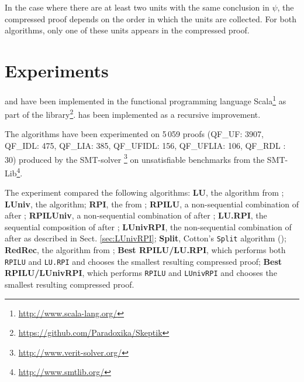 \documentclass{easychair}
\begin{document}
In the case where there are at least two units with the same conclusion in $\psi$, the
compressed proof depends on the order in which the units are collected. For both algorithms, only one of these units appears in the compressed proof.






\section{Experiments} \label{sec:exp}

{\LowerUnivalents} and {\LUnivRPI} have been implemented in the functional programming
language Scala\footnote{\url{http://www.scala-lang.org/}} as part of the \skeptik
library\footnote{\url{https://github.com/Paradoxika/Skeptik}}. {\LowerUnivalents} has been implemented as a
recursive  improvement.

The algorithms have been experimented on 5\,059 proofs 
(QF\_UF: 3907,
    QF\_IDL:  475,
    QF\_LIA:  385,
    QF\_UFIDL:  156,
    QF\_UFLIA:  106,
    QF\_RDL :   30)
produced by the SMT-solver
{\veriT}\footnote{\url{http://www.verit-solver.org/}} on unsatisfiable benchmarks from the
SMT-Lib\footnote{\url{http://www.smtlib.org/}}. 





The experiment compared the following algorithms:
  \textbf{LU}, the {\LowerUnits} algorithm from \cite{LURPI};
  \textbf{LUniv}, the {\LowerUnivalents} algorithm;
  \textbf{RPI}, the {\RecyclePivotsIntersection} from \cite{LURPI};
  \textbf{RPILU}, a non-sequential combination of {\RPI} after {\LowerUnits};
  \textbf{RPILUniv}, a non-sequential combination of {\RPI} after {\LowerUnivalents};
  \textbf{LU.RPI}, the sequential composition of {\LowerUnits} after {\RPI};
  \textbf{LUnivRPI}, the non-sequential combination of {\LowerUnivalents} after {\RPI} as described in Sect. \ref{sec:LUnivRPI};
  \textbf{Split}, Cotton's \texttt{Split} algorithm (\cite{CottonSplit});
  \textbf{RedRec}, the {\ReduceReconstruct} algorithm from \cite{RedRec};
  \textbf{Best RPILU/LU.RPI}, which performs both \texttt{RPILU} and \texttt{LU.RPI} and chooses the smallest resulting compressed proof;
  \textbf{Best RPILU/LUnivRPI}, which performs \texttt{RPILU} and \texttt{LUnivRPI} and chooses the smallest resulting
    compressed proof.
\end{document}
